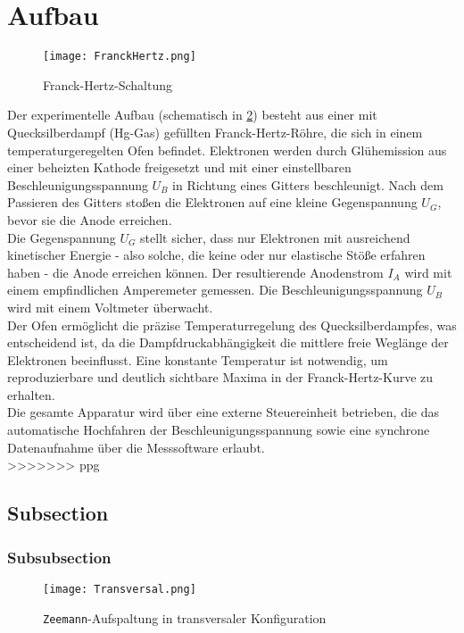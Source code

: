 \section{Aufbau}

\begin{figure}[H]
    \centering
    \texttt{[image: FranckHertz.png]}
    \caption{Franck-Hertz-Schaltung \cite{FranckHertzHg}} 
    \label{fig:FrankHertzSchaltung}    
\end{figure}

Der experimentelle Aufbau (schematisch in \cref{fig:FrankHertzSchaltung}) besteht aus einer mit Quecksilberdampf (Hg-Gas) gefüllten Franck-Hertz-Röhre, die sich in einem temperaturgeregelten Ofen befindet. Elektronen werden durch Glühemission aus einer beheizten Kathode freigesetzt und mit einer einstellbaren Beschleunigungsspannung $ U_B $ in Richtung eines Gitters beschleunigt. Nach dem Passieren des Gitters stoßen die Elektronen auf eine kleine Gegenspannung $ U_G $, bevor sie die Anode erreichen.
\vspace{0.3cm}\\
Die Gegenspannung $ U_G $ stellt sicher, dass nur Elektronen mit ausreichend kinetischer Energie - also solche, die keine oder nur elastische Stöße erfahren haben - die Anode erreichen können. Der resultierende Anodenstrom $ I_A $ wird mit einem empfindlichen Amperemeter gemessen. Die Beschleunigungsspannung $ U_B $ wird mit einem Voltmeter überwacht.
\vspace{0.3cm}\\
Der Ofen ermöglicht die präzise Temperaturregelung des Quecksilberdampfes, was entscheidend ist, da die Dampfdruckabhängigkeit die mittlere freie Weglänge der Elektronen beeinflusst. Eine konstante Temperatur ist notwendig, um reproduzierbare und deutlich sichtbare Maxima in der Franck-Hertz-Kurve zu erhalten.
\vspace{0.3cm}\\
Die gesamte Apparatur wird über eine externe Steuereinheit betrieben, die das automatische Hochfahren der Beschleunigungsspannung sowie eine synchrone Datenaufnahme über die Messsoftware erlaubt.
\vspace{0.3cm}\\

>>>>>>> ppg
\subsection{Subsection}
\subsubsection{Subsubsection}
\begin{figure}[ht]
    \centering
    \texttt{[image: Transversal.png]}
    \caption{\texttt{Zeemann}-Aufspaltung in transversaler Konfiguration} 
    \label{fig:FrankHertzSchaltung}
\end{figure}